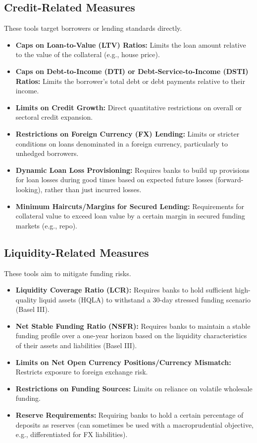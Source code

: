 \subsection{Credit-Related Measures}
These tools target borrowers or lending standards directly.
\begin{itemize}
    \item \textbf{Caps on Loan-to-Value (LTV) Ratios:} Limits the loan amount relative to the value of the collateral (e.g., house price).
    \item \textbf{Caps on Debt-to-Income (DTI) or Debt-Service-to-Income (DSTI) Ratios:} Limits the borrower's total debt or debt payments relative to their income.
    \item \textbf{Limits on Credit Growth:} Direct quantitative restrictions on overall or sectoral credit expansion.
    \item \textbf{Restrictions on Foreign Currency (FX) Lending:} Limits or stricter conditions on loans denominated in a foreign currency, particularly to unhedged borrowers.
    \item \textbf{Dynamic Loan Loss Provisioning:} Requires banks to build up provisions for loan losses during good times based on expected future losses (forward-looking), rather than just incurred losses.
    \item \textbf{Minimum Haircuts/Margins for Secured Lending:} Requirements for collateral value to exceed loan value by a certain margin in secured funding markets (e.g., repo).
\end{itemize}

\subsection{Liquidity-Related Measures}
These tools aim to mitigate funding risks.
\begin{itemize}
    \item \textbf{Liquidity Coverage Ratio (LCR):} Requires banks to hold sufficient high-quality liquid assets (HQLA) to withstand a 30-day stressed funding scenario (Basel III).
    \item \textbf{Net Stable Funding Ratio (NSFR):} Requires banks to maintain a stable funding profile over a one-year horizon based on the liquidity characteristics of their assets and liabilities (Basel III).
    \item \textbf{Limits on Net Open Currency Positions/Currency Mismatch:} Restricts exposure to foreign exchange risk.
    \item \textbf{Restrictions on Funding Sources:} Limits on reliance on volatile wholesale funding.
    \item \textbf{Reserve Requirements:} Requiring banks to hold a certain percentage of deposits as reserves (can sometimes be used with a macroprudential objective, e.g., differentiated for FX liabilities).
\end{itemize}

